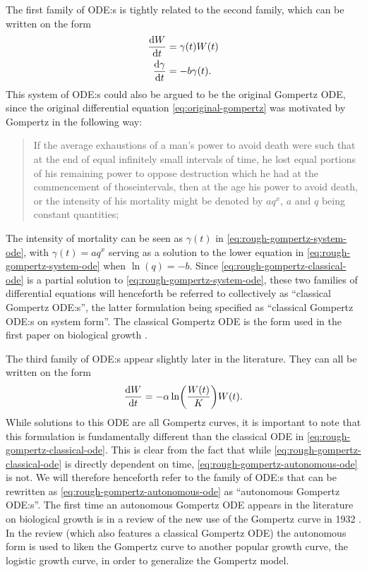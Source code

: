The first family of ODE:s is tightly related to the second family, which can be written on the form
\begin{equation}
  \label{eq:rough-gompertz-system-ode}
  \begin{aligned} 
    \dv{W}{t} &= \gamma(t) W(t)\\
    \dv{\gamma}{t} &= -b \gamma(t).
  \end{aligned}
\end{equation}
This system of ODE:s could also be argued to be the original Gompertz ODE, since the original differential equation \ref{eq:original-gompertz} was motivated by Gompertz in the following way:
\blockquote[{\cite[518]{gompertz1825nature}}]{
  If the average exhaustions of a man's power to avoid death were such that at the end of equal infinitely small intervals of time, he lost equal portions of his remaining power to oppose destruction which he had at the commencement of thoseintervals, then at the age his power to avoid death, or the intensity of his mortality might be denoted by \(aq^x\), \(a\) and \(q\) being constant quantities;
}
The intensity of mortality can be seen as \(\gamma(t)\) in \cref{eq:rough-gompertz-system-ode}, with \(\gamma(t) = aq^x\) serving as a solution to the lower equation in \ref{eq:rough-gompertz-system-ode} when \(\ln(q) = -b\).
Since \cref{eq:rough-gompertz-classical-ode} is a partial solution to \cref{eq:rough-gompertz-system-ode}, these two families of differential equations will henceforth be referred to collectively as \enquote{classical Gompertz ODE:s}, the latter formulation being specified as \enquote{classical Gompertz ODE:s on system form}.
The classical Gompertz ODE is the form used in the first paper on biological growth \cite{davidson1928growth}.

The third family of ODE:s appear slightly later in the literature.
They can all be written on the form
\begin{equation} \label{eq:rough-gompertz-autonomous-ode}
  \dv{W}{t} = -\alpha \ln(\frac{W(t)}{K}) W(t).
\end{equation}
While solutions to this ODE are all Gompertz curves, it is important to note that this formulation is fundamentally different than the classical ODE in \cref{eq:rough-gompertz-classical-ode}.
This is clear from the fact that while \cref{eq:rough-gompertz-classical-ode} is directly dependent on time, \cref{eq:rough-gompertz-autonomous-ode} is not.
We will therefore henceforth refer to the family of ODE:s that can be rewritten as \cref{eq:rough-gompertz-autonomous-ode} as \enquote{autonomous Gompertz ODE:s}.
The first time an autonomous Gompertz ODE appears in the literature on biological growth is in a review of the new use of the Gompertz curve in 1932 \cite{winsor1932gompertz}.
In the review (which also features a classical Gompertz ODE) the autonomous form is used to liken the Gompertz curve to another popular growth curve, the logistic growth curve, in order to generalize the Gompertz model.

